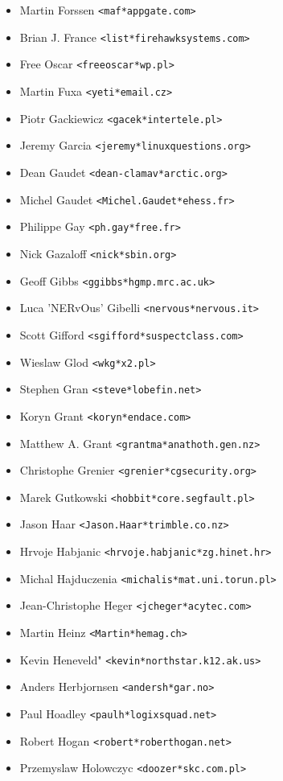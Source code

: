\documentclass[a4paper,titlepage,12pt]{article}
\newcommand{\email}[1]{\texttt{#1}}
\begin{document}
\begin{itemize}
	\item Martin Forssen \email{<maf*appgate.com>}
	\item Brian J. France \email{<list*firehawksystems.com>}
	\item Free Oscar \email{<freeoscar*wp.pl>}
	\item Martin Fuxa \email{<yeti*email.cz>}
	\item Piotr Gackiewicz \email{<gacek*intertele.pl>}
	\item Jeremy Garcia \email{<jeremy*linuxquestions.org>}
	\item Dean Gaudet \email{<dean-clamav*arctic.org>}
	\item Michel Gaudet \email{<Michel.Gaudet*ehess.fr>}
	\item Philippe Gay \email{<ph.gay*free.fr>}
	\item Nick Gazaloff \email{<nick*sbin.org>}
	\item Geoff Gibbs \email{<ggibbs*hgmp.mrc.ac.uk>}
	\item Luca 'NERvOus' Gibelli \email{<nervous*nervous.it>}
	\item Scott Gifford \email{<sgifford*suspectclass.com>}
	\item Wieslaw Glod \email{<wkg*x2.pl>}
	\item Stephen Gran \email{<steve*lobefin.net>}
	\item Koryn Grant \email{<koryn*endace.com>}
	\item Matthew A. Grant \email{<grantma*anathoth.gen.nz>}
	\item Christophe Grenier \email{<grenier*cgsecurity.org>}
	\item Marek Gutkowski \email{<hobbit*core.segfault.pl>}
	\item Jason Haar \email{<Jason.Haar*trimble.co.nz>}
	\item Hrvoje Habjanic \email{<hrvoje.habjanic*zg.hinet.hr>}
	\item Michal Hajduczenia \email{<michalis*mat.uni.torun.pl>}
	\item Jean-Christophe Heger \email{<jcheger*acytec.com>}
	\item Martin Heinz \email{<Martin*hemag.ch>}
	\item Kevin Heneveld" \email{<kevin*northstar.k12.ak.us>}
	\item Anders Herbjornsen \email{<andersh*gar.no>}
	\item Paul Hoadley \email{<paulh*logixsquad.net>}
	\item Robert Hogan \email{<robert*roberthogan.net>}
	\item Przemyslaw Holowczyc \email{<doozer*skc.com.pl>}

\end{itemize}
\end{document}
